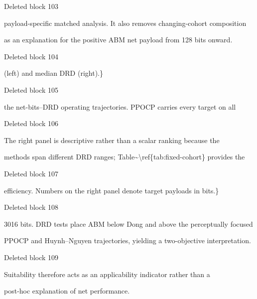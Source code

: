 \documentclass[a4paper,fleqn]{cas-dc}
\newenvironment{RevisionDeletion}{%
  \par\begingroup\color{revisionred}\footnotesize\ttfamily
  \setlength{\parindent}{0pt}\setlength{\parskip}{1pt}\obeyspaces
}{\par\endgroup}
\begin{document}
\begin{RevisionDeletion}
Deleted block 103\par
payload-specific matched analysis. It also removes changing-cohort composition\par
as an explanation for the positive ABM net payload from 128 bits onward.\par
\end{RevisionDeletion}

\begin{RevisionDeletion}
Deleted block 104\par
(left) and median DRD (right).\}\par
\end{RevisionDeletion}

\begin{RevisionDeletion}
Deleted block 105\par
the net-bits--DRD operating trajectories. PPOCP carries every target on all\par
\end{RevisionDeletion}

\begin{RevisionDeletion}
Deleted block 106\par
The right panel is descriptive rather than a scalar ranking because the\par
methods span different DRD ranges; Table\textasciitilde{}\textbackslash{}ref\{tab:fixed-cohort\} provides the\par
\end{RevisionDeletion}

\begin{RevisionDeletion}
Deleted block 107\par
efficiency. Numbers on the right panel denote target payloads in bits.\}\par
\end{RevisionDeletion}

\begin{RevisionDeletion}
Deleted block 108\par
3016 bits. DRD tests place ABM below Dong and above the perceptually focused\par
PPOCP and Huynh--Nguyen trajectories, yielding a two-objective interpretation.\par
\end{RevisionDeletion}

\begin{RevisionDeletion}
Deleted block 109\par
Suitability therefore acts as an applicability indicator rather than a\par
post-hoc explanation of net performance.\par
\end{RevisionDeletion}
\end{document}
